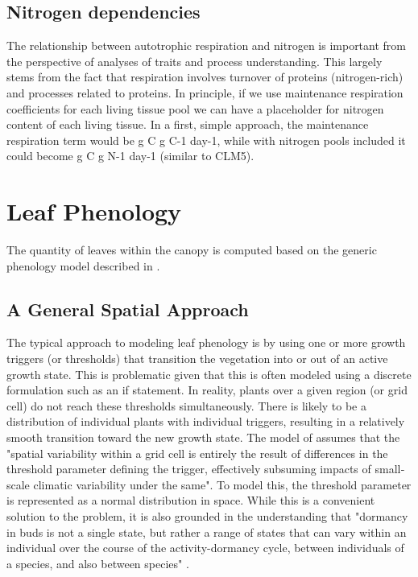 \documentclass[twoside,10pt]{report}
\begin{document}
\subsection{Nitrogen dependencies}

The relationship between autotrophic respiration and nitrogen is important from the perspective of analyses of traits and process understanding. This largely stems from the fact that respiration involves turnover of proteins (nitrogen-rich) and processes related to proteins. In principle, if we use maintenance respiration coefficients for each living tissue pool we can have a placeholder for nitrogen content of each living tissue. In a first, simple approach, the maintenance respiration term would be g C g C-1 day-1, while with nitrogen pools included it could become g C g N-1 day-1 (similar to CLM5).

\section{Leaf Phenology}

The quantity of leaves within the canopy is computed based on the generic phenology model described in \citet{Knorr2010}. 

\subsection{A General Spatial Approach}

The typical approach to modeling leaf phenology is by using one or more growth triggers (or thresholds) that transition the vegetation into or out of an active growth state. This is problematic given that this is often modeled using a discrete formulation such as an if statement. In reality, plants over a given region (or grid cell) do not reach these thresholds simultaneously. There is likely to be a distribution of individual plants with individual triggers, resulting in a relatively smooth transition toward the new growth state. The model of \citet{Knorr2010} assumes that the "spatial variability within a grid cell is entirely the result of differences in the threshold parameter defining the trigger, effectively subsuming impacts of small‐scale climatic variability under the same". To model this, the threshold parameter is represented as a normal distribution in space. While this is a convenient solution to the problem, it is also grounded in the understanding that "dormancy in buds is not a single state, but rather a range of states that can vary within an individual over the course of the activity-dormancy cycle, between individuals of a species, and also between species" \citep{Cooke2012}. 
\end{document}

